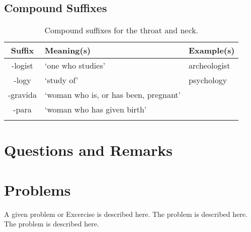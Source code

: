 \subsection{Compound Suffixes}


\begin{longtable}{c | p{} | p{}}
    \caption{Compound suffixes for the throat and neck.}
    \hline
    Suffix & Meaning(s) & Example(s) \\ \hline
        -logist & `one who studies' & archeologist \\
        -logy & `study of' & psychology \\
        -gravida & `woman who is, or has been, pregnant' & \\
        -para & `woman who has given birth' & \\
    \label{tab:Ch9Suffix2}
\end{longtable}


\section{Questions and Remarks}
\label{sec:QR9}






%
%
%


\section*{Problems}
%
\begin{prob}
\label{prob1}
A given problem or Excercise is described here. The
problem is described here. The problem is described here.
\end{prob}



